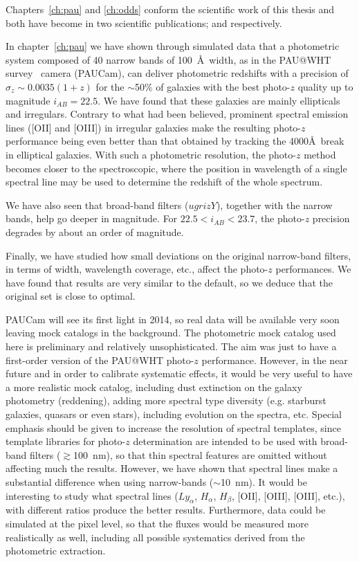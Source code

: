 Chapters~\ref{ch:pau} and \ref{ch:odds} conform the scientific work of this thesis and both have become in two scientific publications; \citet{Marti2014b} and \citet{Marti2014a} respectively. 

In chapter~\ref{ch:pau} we have shown through simulated data that a photometric system composed of 40 narrow bands of 100~\AA \ width, as in the PAU@WHT survey~\citep{Benitez2009} camera (PAUCam), can deliver photometric redshifts with a precision of $\sigma_z \sim 0.0035(1+z)$ for the $\sim$50\% of galaxies with the best photo-$z$ quality up to magnitude $i_{AB}=22.5$. We have found that these galaxies are mainly ellipticals and irregulars. Contrary to what had been believed, prominent spectral emission lines ([OII] and [OIII]) in irregular galaxies make the resulting photo-$z$ performance being even better than that obtained by tracking the 4000\AA \ break in elliptical galaxies. With such a photometric resolution, the photo-$z$ method becomes closer to the spectroscopic, where the position in wavelength of a single spectral line may be used to determine the redshift of the whole spectrum. 

We have also seen that broad-band filters ($ugrizY$), together with the narrow bands, help go deeper in magnitude. For $22.5<i_{AB}<23.7$, the photo-$z$ precision degrades by about an order of magnitude. 

Finally, we have studied how small deviations on the original narrow-band filters, in terms of width, wavelength coverage, etc., affect the photo-$z$ performances. We have found that results are very similar to the default, so we deduce that the original set is close to optimal.

PAUCam will see its first light in 2014, so real data will be available very soon leaving mock catalogs in the background. The photometric mock catalog used here is preliminary and relatively unsophisticated. The aim was just to have a first-order version of the PAU@WHT photo-$z$ performance. However, in the near future and in order to calibrate systematic effects, it would be very useful to have a more realistic mock catalog, including dust extinction on the galaxy photometry (reddening), adding more spectral type diversity (e.g. starburst galaxies, quasars or even stars), including evolution on the spectra, etc. Special emphasis should be given to increase the resolution of spectral templates, since template libraries for photo-$z$ determination \citep[e.g.][]{Coleman1980,Kinney1996} are intended to be used with broad-band filters ($\gtrsim$100~nm), so that thin spectral features are omitted without affecting much the results. However, we have shown that spectral lines make a substantial difference when using narrow-bands ($\sim$10~nm). It would be interesting to study what spectral lines ($Ly_\alpha$, $H_\alpha$, $H_\beta$, [OII], [OIII], [OIII], etc.), with different ratios produce the better results. Furthermore, data could be simulated at the pixel level, so that the fluxes would be measured more realistically as well, including all possible systematics derived from the photometric extraction. 

